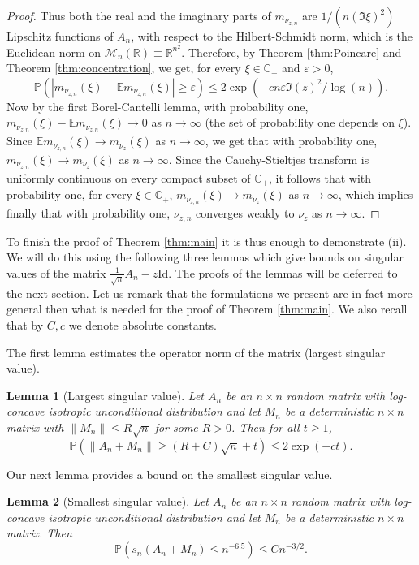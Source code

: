 \documentclass[12pt,reqno]{amsart}
\newtheorem{lemma}{Lemma}[section]
\begin{document}
\begin{proof}
  Thus both the real and the imaginary parts of $m_{\nu_{z,n}}$ are $1/(n(\Im
  \xi)^2)$ Lipschitz functions of $A_n$, with respect to the Hilbert-Schmidt
  norm, which is the Euclidean norm on $\mathcal{M}_n({\mathbb{R}})\equiv{\mathbb{R}}^{n^2}$.
  Therefore, by Theorem \ref{thm:Poincare} and Theorem
  \ref{thm:concentration}, we get, for every $\xi\in{\mathbb{C}}_+$ and $\varepsilon >
  0$,
  \[
  {\mathbb{P}}(|m_{\nu_{z,n}}(\xi) - {\mathbb{E}} m_{\nu_{z,n}}(\xi)| \ge\varepsilon)   \le 2\exp(-cn\varepsilon\Im(z)^2/\log(n)).
  \]
  Now by the first Borel-Cantelli lemma, with probability one,
  $m_{\nu_{z,n}}(\xi) - {\mathbb{E}} m_{\nu_{z,n}}(\xi)\to0$ as $n\to\infty$ (the set of
  probability one depends on $\xi$). Since ${\mathbb{E}} m_{\nu_{z,n}}(\xi)\to
  m_{\nu_{z}}(\xi)$ as $n\to\infty$, we get that with probability one,
  $m_{\nu_{z,n}}(\xi)\to m_{\nu_z}(\xi)$ as $n\to\infty$. Since the
  Cauchy-Stieltjes transform is uniformly continuous on every compact subset
  of ${\mathbb{C}}_+$, it follows that with probability one, for every $\xi\in{\mathbb{C}}_+$,
  $m_{\nu_{z,n}}(\xi)\to m_{\nu_z}(\xi)$ as $n\to\infty$, which implies
  finally that with probability one, $\nu_{z,n}$ converges weakly to $\nu_z$
  as $n\to\infty$.
\end{proof}

To finish the proof of Theorem \ref{thm:main} it is thus enough to demonstrate
(ii). We will do this using the following three lemmas which give bounds on
singular values of the matrix $\frac{1}{\sqrt{n}}A_n - z{\mathrm{Id}}$. The proofs of
the lemmas will be deferred to the next section. Let us remark that the
formulations we present are in fact more general then what is needed for the
proof of Theorem \ref{thm:main}. We also recall that by $C,c$ we denote
absolute constants.

The first lemma estimates the operator norm of the matrix (largest singular
value).

\begin{lemma}[Largest singular value]\label{le:operator_norm}
  Let $A_n$ be an $n\times n$ random matrix with log-concave isotropic
  unconditional distribution and let $M_n$ be a deterministic $n\times n$
  matrix with $\|M_n\| \le R\sqrt{n}$ for some $R > 0$. Then for all $t \ge
  1$,
  \[
  {\mathbb{P}}(\|A_n + M_n\| \ge (R+C)\sqrt{n} + t) \le 2\exp(-ct).
  \]
\end{lemma}

Our next lemma provides a bound on the smallest singular value.

\begin{lemma}[Smallest singular value] \label{le:smallest_sv}Let $A_n$ be an
  $n\times n$ random matrix with log-concave isotropic unconditional
  distribution and let $M_n$ be a deterministic $n\times n$ matrix. Then
  \[
  {\mathbb{P}}(s_n(A_n+M_n) \le  n^{-6.5}) \le Cn^{-3/2}.
  \]
\end{lemma}
\end{document}
